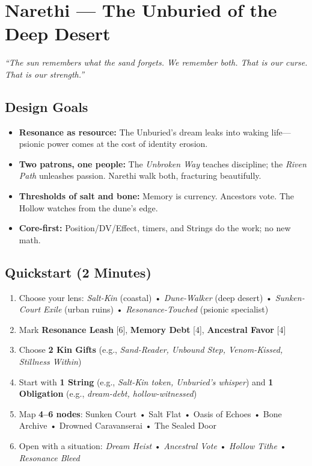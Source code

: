 \documentclass[11pt]{article}
\begin{document}


\section*{Narethi --- The Unburied of the Deep Desert}
\textit{``The sun remembers what the sand forgets. We remember both. That is our curse. That is our strength.''}

\subsection*{Design Goals}
\begin{itemize}[leftmargin=*,nosep]
    \item \textbf{Resonance as resource:} The Unburied's dream leaks into waking life---psionic power comes at the cost of identity erosion.
    \item \textbf{Two patrons, one people:} The \textit{Unbroken Way} teaches discipline; the \textit{Riven Path} unleashes passion. Narethi walk both, fracturing beautifully.
    \item \textbf{Thresholds of salt and bone:} Memory is currency. Ancestors vote. The Hollow watches from the dune's edge.
    \item \textbf{Core-first:} Position/DV/Effect, timers, and Strings do the work; no new math.
\end{itemize}

\subsection*{Quickstart (2 Minutes)}
\begin{enumerate}[leftmargin=*,nosep]
    \item Choose your lens: \textit{Salt-Kin} (coastal) • \textit{Dune-Walker} (deep desert) • \textit{Sunken-Court Exile} (urban ruins) • \textit{Resonance-Touched} (psionic specialist)
    \item Mark \textbf{Resonance Leash} [6], \textbf{Memory Debt} [4], \textbf{Ancestral Favor} [4]
    \item Choose \textbf{2 Kin Gifts} (e.g., \textit{Sand-Reader, Unbound Step, Venom-Kissed, Stillness Within})
    \item Start with \textbf{1 String} (e.g., \textit{Salt-Kin token, Unburied's whisper}) and \textbf{1 Obligation} (e.g., \textit{dream-debt, hollow-witnessed})
    \item Map \textbf{4--6 nodes}: Sunken Court • Salt Flat • Oasis of Echoes • Bone Archive • Drowned Caravanserai • The Sealed Door
    \item Open with a situation: \textit{Dream Heist} • \textit{Ancestral Vote} • \textit{Hollow Tithe} • \textit{Resonance Bleed}
\end{enumerate}
\end{document}

